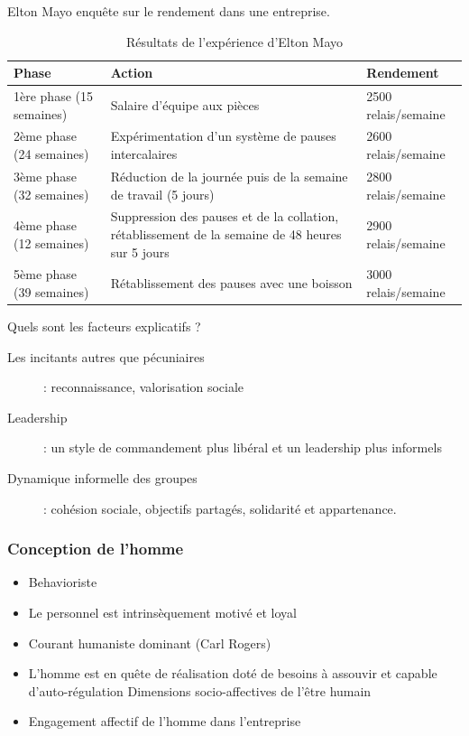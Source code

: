 \documentclass[12pt]{article}
\begin{document}
	  Elton Mayo enquête sur le rendement dans une entreprise.
	  
	  \begin{table}[!ht]
	        \begin{tabular}{p{4.7cm}|p{7.3cm}|p{3.5cm}}
		Phase & Action & Rendement \\
		\hline \hline
		1ère phase (15 semaines) & Salaire d'équipe aux pièces & 2500 relais/semaine \\ \hline
		2ème phase (24 semaines) & Expérimentation d'un système de pauses intercalaires & 2600 relais/semaine \\ \hline
		3ème phase (32 semaines) & Réduction de la journée puis de la semaine de travail (5 jours) & 2800 relais/semaine \\ \hline
		4ème phase (12 semaines) & Suppression des pauses et de la collation, rétablissement de la semaine de 48 heures sur 5 jours & 2900 relais/semaine \\ \hline
		5ème phase (39 semaines) & Rétablissement des pauses avec une boisson & 3000 relais/semaine \\ \hline
	    \end{tabular}
	    \caption{Résultats de l'expérience d'Elton Mayo}
	  \end{table}
	  
	  Quels sont les facteurs explicatifs ?
	  
	  \begin{description}
	   \item[Les incitants autres que pécuniaires] : reconnaissance, valorisation sociale
	   \item[Leadership] : un style de commandement plus libéral et un leadership plus informels
	   \item[Dynamique informelle des groupes] : cohésion sociale, objectifs partagés, solidarité et appartenance.
	  \end{description}
	  
	  \subsubsection{Conception de l'homme}
	  
	  \begin{itemize}
	   \item Behavioriste
	   \item Le personnel est intrinsèquement motivé et loyal
	   \item Courant humaniste dominant (Carl Rogers)
	   \item L'homme est en quête de réalisation
	    \subitem doté de besoins à assouvir et capable d'auto-régulation
	    \subitem Dimensions socio-affectives de l'être humain
	   \item Engagement affectif de l'homme dans l'entreprise
	  \end{itemize}
\end{document}
